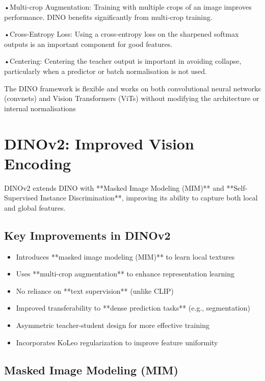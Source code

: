 \documentclass[
]{book}
\begin{document}
•Multi-crop Augmentation: Training with multiple crops of an image improves performance. DINO benefits significantly from multi-crop training.

•Cross-Entropy Loss: Using a cross-entropy loss on the sharpened softmax outputs is an important component for good features.

•Centering: Centering the teacher output is important in avoiding collapse, particularly when a predictor or batch normalisation is not used.

The DINO framework is flexible and works on both convolutional neural networks (convnets) and Vision Transformers (ViTs) without modifying the architecture or internal normalisations

\chapter{DINOv2: Improved Vision Encoding}\label{dinov2-improved-vision-encoding}

DINOv2 extends DINO with **Masked Image Modeling (MIM)** and
**Self-Supervised Instance Discrimination**, improving its ability
to capture both local and global features.

\section{Key Improvements in DINOv2}\label{key-improvements-in-dinov2}

\begin{itemize}
\item
  Introduces **masked image modeling (MIM)** to learn local
  textures
\item
  Uses **multi-crop augmentation** to enhance representation
  learning
\item
  No reliance on **text supervision** (unlike CLIP)
\item
  Improved transferability to **dense prediction tasks** (e.g.,
  segmentation)
\item
  Asymmetric teacher-student design for more effective training
\item
  Incorporates KoLeo regularization to improve feature uniformity
\end{itemize}

\section{Masked Image Modeling (MIM)}\label{masked-image-modeling-mim}
\end{document}
